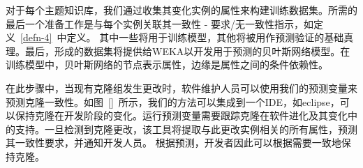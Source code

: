 对于每个主题知识库，我们通过收集其变化实例的属性来构建训练数据集。所需的最后一个准备工作是与每个实例关联其一致性 - 要求/无一致性指示，如定义~\ref{defn-4}~中定义。 其中一些将用于训练模型，其他将被用作预测验证的基础真理。最后，形成的数据集将提供给WEKA以开发用于预测的贝叶斯网络模型。在训练模型中，贝叶斯网络的节点表示属性，边缘是属性之间的条件依赖性。


在此步骤中，当现有克隆组发生更改时，软件维护人员可以使用我们的预测变量来预测克隆一致性。如图~\ref{}~所示，我们的方法可以集成到一个IDE，如eclipse，可以保持克隆在开发阶段的变化。运行预测变量需要跟踪克隆在软件进化及其变化中的支持。一旦检测到克隆更改，该工具将提取与此更改实例相关的所有属性，预测其一致性要求，并通知开发人员。
根据预测，开发者因此可以根据需要一致地保持克隆。


